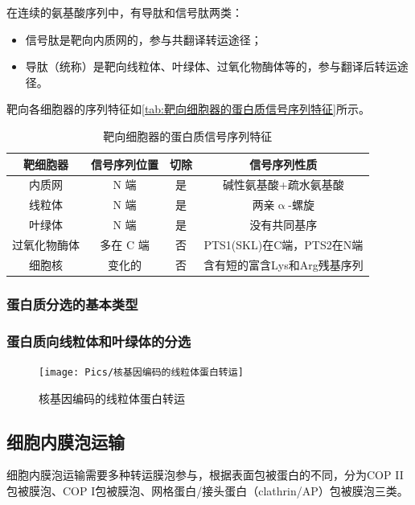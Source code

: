 在连续的氨基酸序列中，有导肽和信号肽两类：

\begin{itemize}
	\item 信号肽是靶向内质网的，参与共翻译转运途径；
	\item 导肽（统称）是靶向线粒体、叶绿体、过氧化物酶体等的，参与翻译后转运途径。
\end{itemize}

靶向各细胞器的序列特征如\autoref{tab:靶向细胞器的蛋白质信号序列特征}所示。

\begin{table}[htbp]
	\centering
	\begin{tabularx}{\textwidth}{|c|c|c|C|}
		\hline
		靶细胞器 & 信号序列位置 & 切除 & 信号序列性质 \\ \hline
		内质网 & N 端 & 是 & 碱性氨基酸+疏水氨基酸 \\ \hline
		线粒体 & N 端 & 是 & 两亲$\upalpha$-螺旋 \\ \hline
		叶绿体 & N 端 & 是 & 没有共同基序 \\ \hline
		过氧化物酶体 & 多在 C 端 & 否 & PTS1(SKL)在C端，PTS2在N端 \\ \hline
		细胞核 & 变化的 & 否 & 含有短的富含Lys和Arg残基序列 \\ \hline
	\end{tabularx}
	\label{tab:靶向细胞器的蛋白质信号序列特征}
	\caption{靶向细胞器的蛋白质信号序列特征}
\end{table}
\subsubsection{蛋白质分选的基本类型}

\subsubsection{蛋白质向线粒体和叶绿体的分选}

\begin{figure}[htbp]
	\centering
	\texttt{[image: Pics/核基因编码的线粒体蛋白转运]}
	\caption{核基因编码的线粒体蛋白转运}
	\label{fig:tim_tom}
\end{figure}

\subsection{细胞内膜泡运输}

细胞内膜泡运输需要多种转运膜泡参与，根据表面包被蛋白的不同，分为COP II包被膜泡、COP I包被膜泡、网格蛋白/接头蛋白（clathrin/AP）包被膜泡三类。




